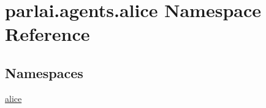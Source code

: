 \hypertarget{namespaceparlai_1_1agents_1_1alice}{}\section{parlai.\+agents.\+alice Namespace Reference}
\label{namespaceparlai_1_1agents_1_1alice}
\subsection*{Namespaces}
\begin{DoxyCompactItemize}
\item 
 \hyperlink{namespaceparlai_1_1agents_1_1alice_1_1alice}{alice}
\end{DoxyCompactItemize}
